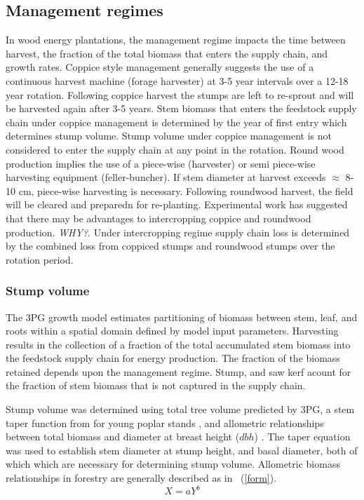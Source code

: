 \documentclass[10pt]{article}
\begin{document}
\subsection*{Management regimes}
\label{sec:management-reg}
In wood energy plantations, the management regime impacts the time
between harvest, the fraction of the total biomass that enters the
supply chain, and growth rates. Coppice style management generally suggests the use
of a continuous harvest machine (forage harvester) at 3-5 year
intervals over a 12-18 year rotation. Following coppice harvest the stumps are left to
re-sprout and will be harvested again after 3-5 years.  Stem biomass that
enters the feedstock supply chain under coppice management is determined
by the year of first entry which determines stump volume.  Stump
volume under coppice management is not considered to enter the supply
chain at any point in the rotation. Round wood production implies the
use of a piece-wise (harvester) or semi piece-wise harvesting
equipment (feller-buncher). If stem diameter at harvest exceeds
$\approx$ 8-10 cm, piece-wise harvesting is necessary. Following 
roundwood harvest, the field will be cleared and preparedn for
re-planting. Experimental work has suggested that there may be advantages to intercropping
coppice and roundwood production. \emph{WHY?}. Under intercropping
regime supply chain loss is determined by the combined loss from
coppiced stumps and roundwood stumps over the rotation period.

\subsubsection*{Stump volume}
\label{sec:stump-volume}

The 3PG growth model estimates partitioning of biomass between stem,
leaf, and roots within a spatial domain defined by model input
parameters. Harvesting results in the collection of a fraction
of the total accumulated stem biomass into the feedstock supply chain
for energy production. The fraction of the biomass retained depends
upon the management regime. Stump, and saw kerf acount for the
fraction of stem biomass that is not captured in the supply chain.

Stump volume was determined using total tree volume predicted by 3PG,
a stem taper function from for young poplar stands
\cite{Benbrahim2003} , and allometric relationships between total
biomass and diameter at breast height ($dbh$) \cite{Brahim2000}. The
taper equation was used to establish stem diameter at stump height,
and basal diameter, both of which which are necessary for determining
stump volume. Allometric biomass relationships in forestry are generally described as in ~(\ref{form}). 
\begin{equation}
  \label{eq:form}
  X=aY^b
\end{equation}
\end{document}
